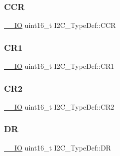 \subsubsection{\texorpdfstring{CCR}{CCR}}
{\footnotesize\ttfamily \mbox{\hyperlink{group___c_m_s_i_s___c_m3__core__definitions_gaec43007d9998a0a0e01faede4133d6be}{\+\_\+\+\_\+\+IO}} uint16\+\_\+t I2\+C\+\_\+\+Type\+Def\+::\+C\+CR}

\mbox{\label{struct_i2_c___type_def_ad35ea0b199cefb757de20e9b78168534}} 
\subsubsection{\texorpdfstring{CR1}{CR1}}
{\footnotesize\ttfamily \mbox{\hyperlink{group___c_m_s_i_s___c_m3__core__definitions_gaec43007d9998a0a0e01faede4133d6be}{\+\_\+\+\_\+\+IO}} uint16\+\_\+t I2\+C\+\_\+\+Type\+Def\+::\+C\+R1}

\mbox{\label{struct_i2_c___type_def_ac8bff45acc455489620d50e697a24c9d}} 
\subsubsection{\texorpdfstring{CR2}{CR2}}
{\footnotesize\ttfamily \mbox{\hyperlink{group___c_m_s_i_s___c_m3__core__definitions_gaec43007d9998a0a0e01faede4133d6be}{\+\_\+\+\_\+\+IO}} uint16\+\_\+t I2\+C\+\_\+\+Type\+Def\+::\+C\+R2}

\mbox{\label{struct_i2_c___type_def_a5c1551b886fbb8e801b9203f6d7dc7c5}} 
\subsubsection{\texorpdfstring{DR}{DR}}
{\footnotesize\ttfamily \mbox{\hyperlink{group___c_m_s_i_s___c_m3__core__definitions_gaec43007d9998a0a0e01faede4133d6be}{\+\_\+\+\_\+\+IO}} uint16\+\_\+t I2\+C\+\_\+\+Type\+Def\+::\+DR}

\mbox{\label{struct_i2_c___type_def_ad218fdcb9606477c1d63f8ee38d3c5c9}} 
